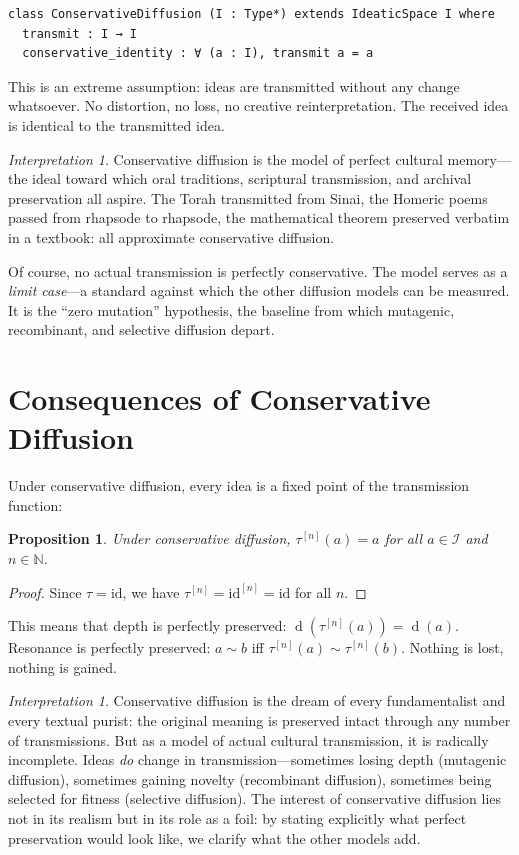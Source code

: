 \documentclass[11pt,openany]{book}
\theoremstyle{definition}
\theoremstyle{plain}
\newtheorem{proposition}[axiom]{Proposition}
\theoremstyle{remark}
\newtheorem{interpretation}[axiom]{Interpretation}
\newcommand{\IS}{\mathcal{I}}               %
\newcommand{\res}{\sim}                      %
\newcommand{\depth}{\operatorname{d}}       %
\newcommand{\transmit}{\tau}                 %
\begin{document}
\begin{lstlisting}
class ConservativeDiffusion (I : Type*) extends IdeaticSpace I where
  transmit : I → I
  conservative_identity : ∀ (a : I), transmit a = a
\end{lstlisting}

This is an extreme assumption: ideas are transmitted without any change whatsoever. No distortion, no loss, no creative reinterpretation. The received idea is identical to the transmitted idea.

\begin{interpretation}
Conservative diffusion is the model of perfect cultural memory---the ideal toward which oral traditions, scriptural transmission, and archival preservation all aspire. The Torah transmitted from Sinai, the Homeric poems passed from rhapsode to rhapsode, the mathematical theorem preserved verbatim in a textbook: all approximate conservative diffusion.

Of course, no actual transmission is perfectly conservative. The model serves as a \emph{limit case}---a standard against which the other diffusion models can be measured. It is the ``zero mutation'' hypothesis, the baseline from which mutagenic, recombinant, and selective diffusion depart.
\end{interpretation}

\section{Consequences of Conservative Diffusion}

Under conservative diffusion, every idea is a fixed point of the transmission function:

\begin{proposition}
Under conservative diffusion, $\transmit^{[n]}(a) = a$ for all $a \in \IS$ and $n \in \mathbb{N}$.
\end{proposition}

\begin{proof}
Since $\transmit = \mathrm{id}$, we have $\transmit^{[n]} = \mathrm{id}^{[n]} = \mathrm{id}$ for all $n$.
\end{proof}

This means that depth is perfectly preserved: $\depth(\transmit^{[n]}(a)) = \depth(a)$. Resonance is perfectly preserved: $a \res b$ iff $\transmit^{[n]}(a) \res \transmit^{[n]}(b)$. Nothing is lost, nothing is gained.

\begin{interpretation}
Conservative diffusion is the dream of every fundamentalist and every textual purist: the original meaning is preserved intact through any number of transmissions. But as a model of actual cultural transmission, it is radically incomplete. Ideas \emph{do} change in transmission---sometimes losing depth (mutagenic diffusion), sometimes gaining novelty (recombinant diffusion), sometimes being selected for fitness (selective diffusion). The interest of conservative diffusion lies not in its realism but in its role as a foil: by stating explicitly what perfect preservation would look like, we clarify what the other models add.
\end{interpretation}
\end{document}
